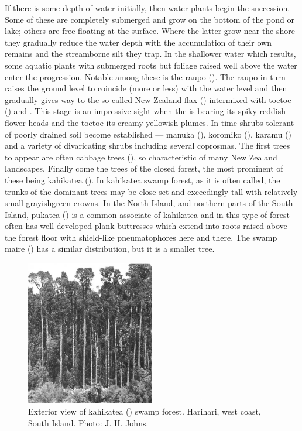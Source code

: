 If there is some depth of water initially, then water plants begin the succession.
Some of these are completely submerged and grow on the bottom of the pond or lake; others are free floating at the surface.
Where the latter grow near the shore they gradually reduce the water depth with the accumulation of their own remains and the streamborne silt they trap.
In the shallower water which results, some aquatic plants with submerged roots but foliage raised well above the water enter the progression.
Notable among these is the raupo ().
The raupo in turn raises the ground level to coincide (more or less) with the water level and then gradually gives way to the so-called New Zealand flax () intermixed with toetoe () and .
This stage is an impressive sight when the  is bearing its spiky reddish flower heads and the toetoe its creamy yellowish plumes.
In time shrubs tolerant of poorly drained soil become established --- manuka (), koromiko (), karamu () and a variety of divaricating shrubs including several coprosmas.
The first trees to appear are often cabbage trees (), so characteristic of many New Zealand landscapes.
Finally come the trees of the closed forest, the most prominent of these being kahikatea ().
In kahikatea swamp forest, as it is often called, the trunks of the dominant trees may be close-set and exceedingly tall with relatively small grayishgreen crowns.
In the North Island, and northern parts of the South Island, pukatea () is a common associate of kahikatea and in this type of forest often has well-developed plank buttresses which extend into roots raised above the forest floor with shield-like pneumatophores here and there.
The swamp maire () has a similar distribution, but it is a smaller tree.

\begin{figure}
	\includegraphics[width=0.5\textwidth]{graphics/figure67kahikatea.jpg}
	\centering
	\caption[Exterior view of kahikatea swamp forest]{Exterior view of kahikatea () swamp forest.
	Harihari, west coast, South Island.
	Photo: J. H. Johns.}%
	\label{fig:67kahikatea}
\end{figure}

